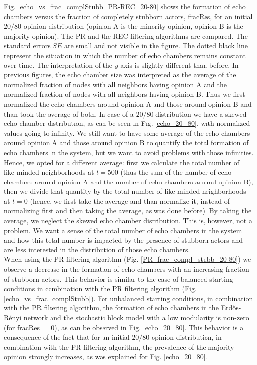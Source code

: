 \documentclass[11 pt , letterpaper , twoside , openright]{book}
\begin{document}
\noindent
Fig. \ref{echo_vs_frac_complStubb_PR-REC_20-80} shows the formation of echo chambers versus the fraction of completely stubborn actors, fracRes, for an initial $20/80$ opinion distribution (opinion A is the minority opinion, opinion B is the majority opinion). The PR and the REC filtering algorithms are compared. The standard errors $SE$ are small and not visible in the figure. The dotted black line represent the situation in which the number of echo chambers remains constant over time. The interpretation of the $y$-axis is slightly different than before. In previous figures, the echo chamber size was interpreted as the average of the normalized fraction of nodes with all neighbors having opinion A and the normalized fraction of nodes with all neighbors having opinion B. Thus we first normalized the echo chambers around opinion A and those around opinion B and than took the average of both. In case of a $20/80$ distribution we have a skewed echo chamber distribution, as can be seen in Fig. \ref{echo_20_80}, with normalized values going to infinity. We still want to have some average of the echo chambers around opinion A and those around opinion B to quantify the total formation of echo chambers in the system, but we want to avoid problems with those infinities. Hence, we opted for a different average: first we calculate the total number of like-minded neighborhoods at $t=500$ (thus the sum of the number of echo chambers around opinion A and the number of echo chambers around opinion B), then we divide that quantity by the total number of like-minded neighborhoods at $t=0$ (hence, we first take the average and than normalize it, instead of normalizing first and then taking the average, as was done before). By taking the average, we neglect the skewed echo chamber distribution. This is, however, not a problem. We want a sense of the total number of echo chambers in the system and how this total number is impacted by the presence of stubborn actors and are less interested in the distribution of those echo chambers. \\
\newline
When using the PR filtering algorithm (Fig. \ref{PR_frac_compl_stubb_20-80}) we observe a decrease in the formation of echo chambers with an increasing fraction of stubborn actors. This behavior is similar to the case of balanced starting conditions in combination with the PR filtering algorithm (Fig. \ref{echo_vs_frac_complStubb}). For unbalanced starting conditions, in combination with the PR filtering algorithm, the formation of echo chambers in the Erd\H{o}s-R\'{e}nyi network and the stochastic block model with a low modularity is non-zero (for fracRes $=0$), as can be observed in Fig. \ref{echo_20_80}. This behavior is a consequence of the fact that for an initial $20/80$ opinion distribution, in combination with the PR filtering algorithm, the prevalence of the majority opinion strongly increases, as was explained for Fig. \ref{echo_20_80}. \\
\end{document}
